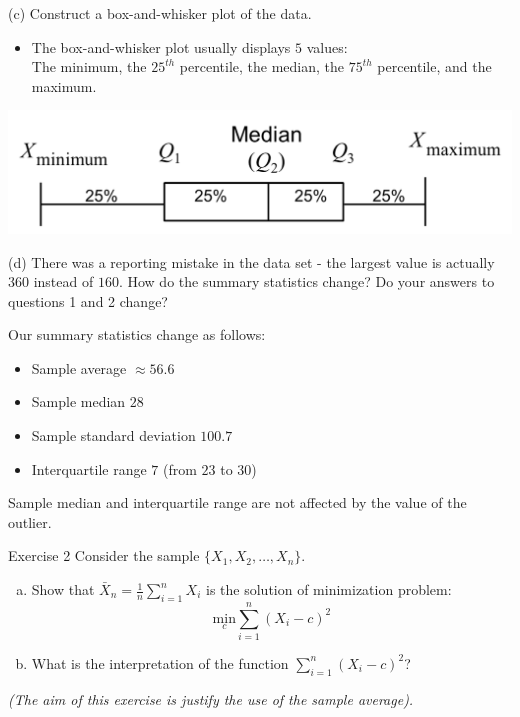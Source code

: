 \documentclass[
  11pt,
  ignorenonframetext,
]{beamer}
\providecommand{\tightlist}{%
  \setlength{\itemsep}{0pt}\setlength{\parskip}{0pt}}
\begin{document}
\begin{frame}{(c) Construct a box-and-whisker plot of the data.}
\protect\hypertarget{c-construct-a-box-and-whisker-plot-of-the-data.}{}
\pause

\begin{itemize}
\tightlist
\item
  The box-and-whisker plot usually displays \(5\) values:\\
  The minimum, the \(25^{th}\) percentile, the median, the \(75^{th}\)
  percentile, and the maximum.
\end{itemize}

\begin{center}\includegraphics[width=0.7\linewidth]{pictures/Box-and-Whisker} \end{center}
\end{frame}

\begin{frame}{(d) There was a reporting mistake in the data set - the
largest value is actually \(360\) instead of \(160\). How do the summary
statistics change? Do your answers to questions 1 and 2 change?}
\protect\hypertarget{d-there-was-a-reporting-mistake-in-the-data-set---the-largest-value-is-actually-360-instead-of-160.-how-do-the-summary-statistics-change-do-your-answers-to-questions-1-and-2-change}{}
\pause

Our summary statistics change as follows:

\begin{itemize}
\item
  Sample average \(\approx 56.6\)
\item
  Sample median \(28\)
\item
  Sample standard deviation \(100.7\)
\item
  Interquartile range \(7\) (from \(23\) to \(30\))
\end{itemize}

Sample median and interquartile range are not affected by the value of
the outlier.
\end{frame}

\begin{frame}{Exercise 2}
\protect\hypertarget{exercise-2}{}
Consider the sample \(\{X_1, X_2, \ldots, X_n\}\).

\begin{enumerate}
[a.]
\item
  Show that \(\bar{X}_n = \frac{1}{n} \sum_{i=1}^n X_i\) is the solution
  of minimization problem: \[
  \tag{1}
  \underset{c}{\text{min}} \sum_{i=1}^{n} \left(X_i - c\right)^2
  \]
\item
  What is the interpretation of the function
  \(\sum_{i=1}^{n} \left(X_i - c\right)^2\)?
\end{enumerate}

\emph{(The aim of this exercise is justify the use of the sample
average).}
\end{frame}
\end{document}
